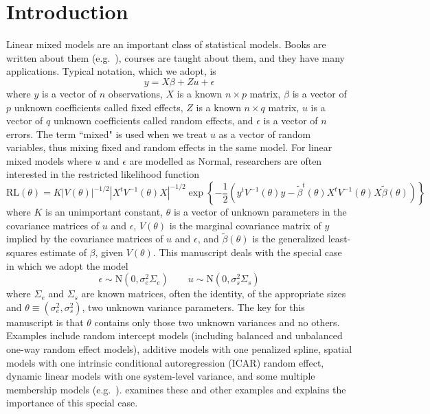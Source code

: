 \documentclass[ejs]{imsart}
\newcommand{\N}{\text{N}} %
\newcommand{\RLorig}{\text{RL}}
\begin{document}
\section{Introduction}
\label{sec:intro}
Linear mixed models are an important class of statistical models.  Books are written about them (e.g.\ \citealt{bryk_raudenbush:1992, verbeke&molenberghs:2000, hodges:2013, west&welch&galecki:2014}),  courses are taught about them, and they have many applications.  Typical notation, which we adopt, is
\begin{equation}
\label{eq:lmm}
	y = X\beta + Zu + \epsilon
\end{equation}
where $y$ is a vector of $n$ observations, $X$ is a known $n \times p$ matrix, $\beta$ is a vector of $p$ unknown coefficients called fixed effects, $Z$ is a known $n \times q$ matrix, $u$ is a vector of $q$ unknown coefficients called random effects, and $\epsilon$ is a vector of $n$ errors. The term ``mixed" is used when we treat $u$ as a vector of random variables, thus mixing fixed and random effects in the same model.  For linear mixed models where $u$ and $\epsilon$ are modelled as Normal, researchers are often interested in the restricted likelihood function
\begin{equation}
\label{eq:rll}
  \RLorig(\theta) = K |V(\theta)|^{-1/2}|X^tV^{-1}(\theta)X|^{-1/2}
                       \exp\left\{ -\frac{1}{2} \left(y^tV^{-1}(\theta)y -
                                                                \tilde\beta^t(\theta)X^tV^{-1}(\theta)X\tilde\beta(\theta)
                                                         \right)
                              \right\}
\end{equation}
where $K$ is an unimportant constant, $\theta$ is a vector of unknown parameters in the covariance matrices of $u$ and $\epsilon$, $V(\theta)$ is the marginal covariance matrix of $y$ implied by the covariance matrices of $u$ and $\epsilon$, and $\tilde\beta(\theta)$ is the generalized least-squares estimate of $\beta$, given $V(\theta)$.
This manuscript deals with the special case in which we adopt the model
\begin{equation*}
	\epsilon \sim \N (0, \sigma_e^2 \Sigma_e) \qquad u \sim \N (0, \sigma_s^2 \Sigma_s)
\end{equation*}
where $\Sigma_e$ and $\Sigma_s$ are known matrices, often the identity, of the appropriate sizes and $\theta \equiv (\sigma_e^2, \sigma_s^2)$, two unknown variance parameters.  The key for this manuscript is that $\theta$ contains only those two unknown variances and no others.  Examples include random intercept models (including balanced and unbalanced one-way random effect models), additive models with one penalized spline, spatial models with one intrinsic conditional autoregression (ICAR) random effect, dynamic linear models with one system-level variance, and some multiple membership models (e.g.\ \citealt{browne_etal:2001, mccaffrey_etal:2004}).  \cite{hodges:2013} examines these and other examples and explains the importance of this special case.
\end{document}
